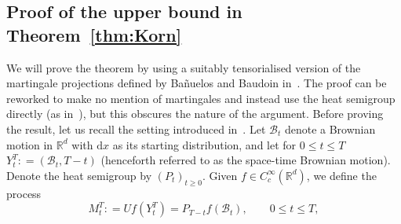 \documentclass[11pt, a4paper]{amsart}
\theoremstyle{definition}
\theoremstyle{remark}
\newcommand{\R}{\mathbb{R}}
\begin{document}
\subsection{Proof of the upper bound
in Theorem~\ref{thm:Korn}}
We will prove the theorem
by using a suitably tensorialised
version of the martingale
projections defined by Bañuelos and Baudoin
in~\cite{BanuelosBaudoin2013}.
The proof can be reworked
to make no mention of martingales and
instead use the heat semigroup
directly (as
in~\cite{Petermichl2002HEATINGQUASIREGULAR}),
but this obscures the nature of the argument.
Before proving the result, let us recall
the setting introduced in~\cite{BanuelosBaudoin2013}.
Let $\mathcal B_t$ denote a Brownian motion in $\R^d$
with $\mathrm{d}x$ as its starting distribution,
and let for $0\le t\le T$
$Y^T_t\mathrel{:}=(\mathcal B_t, T-t)$
(henceforth referred to as
the space-time Brownian motion).
Denote the heat semigroup by $(P_t)_{t\ge 0}$.
Given $f\in C^\infty_c(\mathbb{R}^d)$,
we define the process
\begin{equation*}
  M_t^T \mathrel{:}=
 Uf(Y_t^T)=P_{T-t}f(\mathcal B_t),\qquad 0\le t\le T,
\end{equation*}
\end{document}
